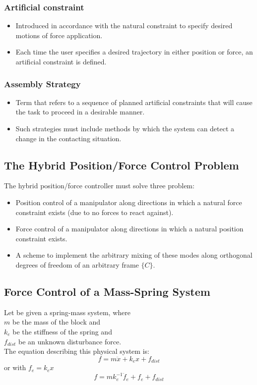 \documentclass[10pt,a4paper]{article}
\begin{document}
\subsubsection{Artificial constraint}
\begin{itemize}
	\item Introduced in accordance with the natural constraint to specify desired motions of force application.
	\item Each time the user specifies a desired trajectory in either position or force, an artificial constraint is defined.
\end{itemize}

\subsubsection{Assembly Strategy}
\begin{itemize}
	\item Term that refers to a sequence of planned artificial constraints that will cause the task to proceed in a desirable manner.
	\item Such strategies must include methods by which the system can detect a change in the contacting situation.
\end{itemize}

\subsection{The Hybrid Position/Force Control Problem}
The hybrid position/force controller must solve three problem:
\begin{itemize}
	\item Position control of a manipulator along directions in which a natural force constraint exists (due to no forces to react against).
	\item Force control of a manipulator along directions in which a natural position constraint exists. 
	\item A scheme to implement the arbitrary mixing of these modes along orthogonal degrees of freedom of an arbitrary frame $\{C\}$.
\end{itemize}

\subsection{Force Control of a Mass-Spring System}
Let be given a spring-mass system, where \\
$m$ be the mass of the block and \\
$k_e$ be the stiffness of the spring and \\
$f_{dist}$ be an unknown disturbance force. \\
The equation describing this physical system is:
$$
	f = m \ddot x + k_e x + f_{dist}
$$
or with $f_e = k_e x$
$$
	f = mk_e^{-1} \ddot f_e + f_e + f_{dist}
$$
\end{document}
